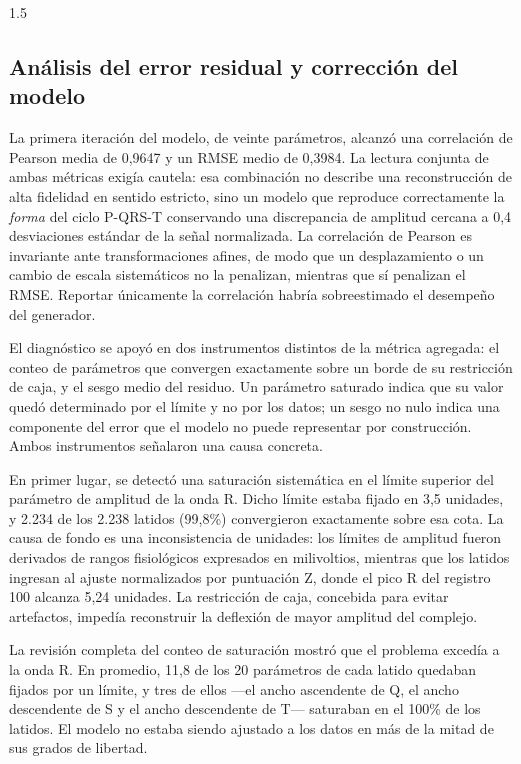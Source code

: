 \begin{spacing}{1.5}
\subsection{Análisis del error residual y corrección del modelo}\label{sec:residuo}

La primera iteración del modelo, de veinte parámetros, alcanzó una correlación de Pearson media de 0,9647 y un RMSE medio de 0,3984. La lectura conjunta de ambas métricas exigía cautela: esa combinación no describe una reconstrucción de alta fidelidad en sentido estricto, sino un modelo que reproduce correctamente la \emph{forma} del ciclo P-QRS-T conservando una discrepancia de amplitud cercana a 0,4 desviaciones estándar de la señal normalizada. La correlación de Pearson es invariante ante transformaciones afines, de modo que un desplazamiento o un cambio de escala sistemáticos no la penalizan, mientras que sí penalizan el RMSE. Reportar únicamente la correlación habría sobreestimado el desempeño del generador.

El diagnóstico se apoyó en dos instrumentos distintos de la métrica agregada: el conteo de parámetros que convergen exactamente sobre un borde de su restricción de caja, y el sesgo medio del residuo. Un parámetro saturado indica que su valor quedó determinado por el límite y no por los datos; un sesgo no nulo indica una componente del error que el modelo no puede representar por construcción. Ambos instrumentos señalaron una causa concreta.

En primer lugar, se detectó una saturación sistemática en el límite superior del parámetro de amplitud de la onda R. Dicho límite estaba fijado en 3,5 unidades, y 2.234 de los 2.238 latidos (99,8\%) convergieron exactamente sobre esa cota. La causa de fondo es una inconsistencia de unidades: los límites de amplitud fueron derivados de rangos fisiológicos expresados en milivoltios, mientras que los latidos ingresan al ajuste normalizados por puntuación Z, donde el pico R del registro 100 alcanza 5,24 unidades. La restricción de caja, concebida para evitar artefactos, impedía reconstruir la deflexión de mayor amplitud del complejo.

La revisión completa del conteo de saturación mostró que el problema excedía a la onda R. En promedio, 11,8 de los 20 parámetros de cada latido quedaban fijados por un límite, y tres de ellos —el ancho ascendente de Q, el ancho descendente de S y el ancho descendente de T— saturaban en el 100\% de los latidos. El modelo no estaba siendo ajustado a los datos en más de la mitad de sus grados de libertad.


\end{spacing}
